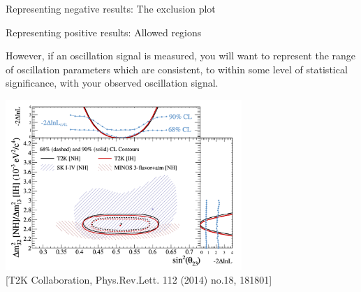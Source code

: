 \begin{frame}{Representing negative results: The exclusion plot}
\end{frame}

%
%
%

\begin{frame}{Representing positive results: Allowed regions}

{\small
However, if an oscillation signal is measured,
you will want to represent the range of oscillation parameters which are consistent,
to within some level of statistical significance, with
your observed oscillation signal.\\
}

\begin{center}
  \includegraphics[width=0.67\textwidth]{./images/osc101/allowed_regions.png}\\
  {\tiny \color{blue}[T2K Collaboration, Phys.Rev.Lett. 112 (2014) no.18, 181801]}
\end{center}

\end{frame}

%
%
%

